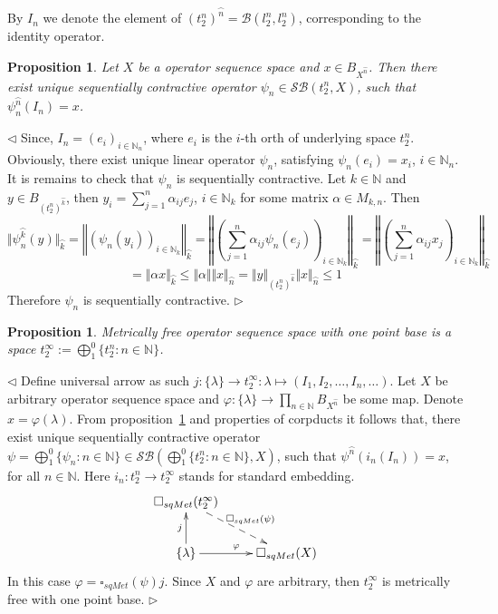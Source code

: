 \documentclass[12pt]{article}
\newtheorem{proposition}[theorem]{Proposition}
\newenvironment{proof}{\par $\triangleleft$}{$\triangleright$}
\begin{document}
By $I_n$ we denote the element of 
${(t_2^n)}^{\wideparen{n}} = \mathcal{B}(l_2^n, l_2^n)$, corresponding to 
the identity operator.

\begin{proposition}\label{PrMetrFrLem} Let $X$ be a operator sequence space 
and $x \in B_{X^{\wideparen{n}}}$. Then there exist unique sequentially 
contractive operator 
$\psi_n \in \mathcal{SB}(t_2^n, X)$, 
such that $\psi_n^{\wideparen{n}}(I_n) = x$.
\end{proposition}
\begin{proof}
Since, $I_n = {(e_i)}_{i\in\mathbb{N}_n}$, where $e_i$ is the $i$-th orth of 
underlying space $t_2^n$. Obviously, there exist unique linear operator 
$\psi_n$, satisfying $\psi_n(e_i) = x_i$, $i\in\mathbb{N}_n$. 
It is remains to check that $\psi_n$ is sequentially contractive. 
Let $k \in \mathbb{N}$ and $y \in B_{{(t_2^n)}^{\wideparen{k}}} $, 
then $y_i = \sum_{j = 1}^n \alpha_{ij}e_j$, $i\in\mathbb{N}_k$ 
for some matrix $\alpha\in M_{k,n}$. Then
$$
\Vert\psi_n^{\wideparen{k}}(y)\Vert_{\wideparen{k}}
=\left\Vert
    {\left(\psi_n(y_i)\right)}_{i\in\mathbb{N}_k}
\right\Vert_{\wideparen{k}}
=\left\Vert
{\left(
    \sum\limits_{j=1}^n\alpha_{ij}\psi_n(e_j)
\right)}_{i\in\mathbb{N}_k}\right\Vert_{\wideparen{k}}
=\left\Vert
    {\left(\sum\limits_{j=1}^n\alpha_{ij}x_j\right)}_{i\in\mathbb{N}_k}
\right\Vert_{\wideparen{k}}
$$
$$
=\Vert\alpha x\Vert_{\wideparen{k}} \leq\Vert\alpha\Vert\Vert
x\Vert_{\wideparen{n}} =\Vert y\Vert_{{(t_2^n)}^{\wideparen{k}}}\Vert
x\Vert_{\wideparen{n}}\leq 1
$$
Therefore $\psi_n$ is sequentially contractive.
\end{proof}

\begin{proposition}\label{PrOnePtMetrFr} Metrically free operator sequence 
space with one point base is a space 
$t_2^{\infty}:=\bigoplus_1^0  \{t_2^n: n \in \mathbb{N} \}$.
\end{proposition}
\begin{proof}
Define universal arrow as such 
$j: \{\lambda \}\to t_2^\infty:\lambda\mapsto(I_1,I_2,\ldots,I_n,\ldots)$. 
Let $X$ be arbitrary operator sequence space and 
$\varphi: \{\lambda \}\to \prod_{n \in \mathbb{N}} B_{X^{\wideparen{n}}}$ 
be some map. Denote $x=\varphi(\lambda)$. From proposition~\ref{PrMetrFrLem} and 
properties of corpducts it  follows that, there exist unique sequentially 
contractive operator 
$\psi=\bigoplus_1^0 \{\psi_n:n\in\mathbb{N} \}
\in\mathcal{SB}\left(\bigoplus_1^0 \{ t_2^n:n\in\mathbb{N} \}, X\right)$, such 
that $\psi^{\wideparen{n}}(i_n(I_n)) = x$, for all $n \in \mathbb{N}$. 
Here $i_n:t_2^n\to t_2^\infty$ stands for standard embedding.
$$
\xymatrix{{\square_{sqMet} (t_2^\infty)} 
\ar@{-->}[dr]^{\square_{sqMet} (\psi)}  %
& \\
{ \{\lambda \}} 
\ar[u]^{j} \ar[r]^{\varphi} &{\square_{sqMet} (X)}}  %
$$
In this case $\varphi=\square_{sqMet}(\psi) j$. Since $X$ and $\varphi$ 
are arbitrary, then $t_2^\infty$ is metrically free with one point base. 
\end{proof}
\end{document}
